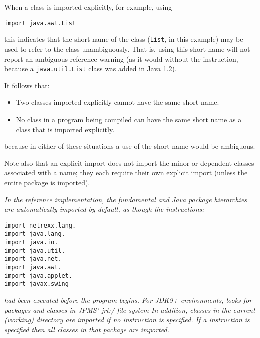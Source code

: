 When a class is imported explicitly, for example, using
\begin{lstlisting}
import java.awt.List
\end{lstlisting}
this indicates that the short name of the class (\texttt{List},
in this example) may be used to refer to the class unambiguously.
That is, using this short name will not report an ambiguous reference
warning (as it would without the  instruction, because
a \texttt{java.util.List} class was added in Java 1.2).
 
It follows that:
\begin{itemize}
\item Two classes imported explicitly cannot have the same short name.
\item No class in a program being compiled can have the same short name as
a class that is imported explicitly.
\end{itemize}
because in either of these situations a use of the short name would
be ambiguous.
 
Note also that an explicit import does not import the minor or dependent
classes associated with a name; they each require their own explicit
import (unless the entire package is imported).
 
\emph{In the reference implementation, the fundamental \nr{} and Java
package hierarchies are automatically imported by default, as though the
instructions:}
\begin{lstlisting}
import netrexx.lang.
import java.lang.
import java.io.
import java.util.
import java.net.
import java.awt.
import java.applet.
import javax.swing
\end{lstlisting}
\emph{had been executed before the program begins.
 For JDK9+ environments, \nr{} looks for packages and classes in JPMS’
jrt:/ file system 
In addition, classes in the current (working) directory are imported if
no  instruction is specified.  If a 
instruction is specified then all classes in that package are imported.
}
